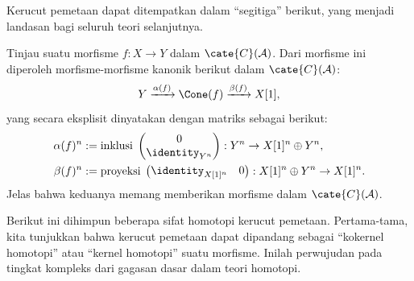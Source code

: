 Kerucut pemetaan dapat ditempatkan dalam ``segitiga'' berikut, yang menjadi
landasan bagi seluruh teori selanjutnya.

\begin{definisi}\label{def:cone-triangle}
	Tinjau suatu morfisme $f:X\to Y$ dalam $\cate{C}(\mathcal{A})$. Dari
	morfisme ini diperoleh morfisme-morfisme kanonik berikut dalam
	$\cate{C}(\mathcal{A})$:
	\[ Y \xrightarrow{\alpha(f)} \Cone(f) \xrightarrow{\beta(f)} X[1] , \]
	yang secara eksplisit dinyatakan dengan matriks sebagai berikut:
	\begin{align*}
		\alpha(f)^n & := \text{inklusi}\; \begin{pmatrix} 0 \\ \identity_{Y^n} \end{pmatrix}: Y^n \to X[1]^n \oplus Y^n , \\
		\beta(f)^n & := \text{proyeksi}\; \begin{pmatrix} \identity_{X[1]^n} & 0 \end{pmatrix}: X[1]^n \oplus Y^n \to X[1]^n .
	\end{align*}
	Jelas bahwa keduanya memang memberikan morfisme dalam
	$\cate{C}(\mathcal{A})$.
\end{definisi}

Berikut ini dihimpun beberapa sifat homotopi kerucut pemetaan. Pertama-tama,
kita tunjukkan bahwa kerucut pemetaan dapat dipandang sebagai ``kokernel
homotopi'' atau ``kernel homotopi'' suatu morfisme. Inilah perwujudan pada
tingkat kompleks dari gagasan dasar dalam teori homotopi.


